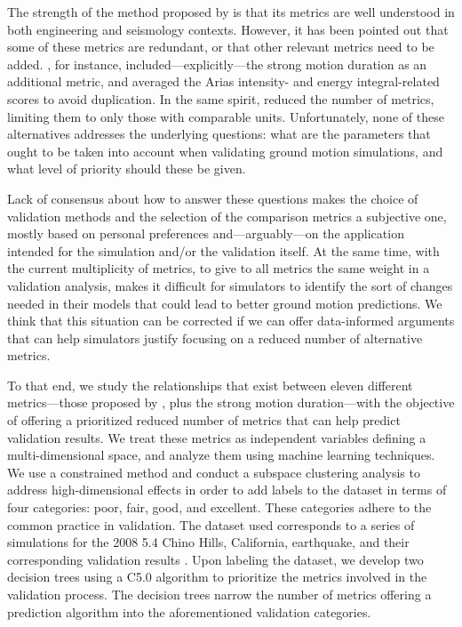 The strength of the method proposed by \citet{Anderson_2004_Proc} is that its metrics are well understood in both engineering and seismology contexts. However, it has been pointed out that some of these metrics are redundant, or that other relevant metrics need to be added. \citet{Taborda_2013_BSSA}, for instance, included---explicitly---the strong motion duration \citep{Trifunac_1975_BSSA} as an additional metric, and averaged the Arias intensity- and energy integral-related scores to avoid duplication. In the same spirit, \citet{Maufroy_2015_BSSA} reduced the number of metrics, limiting them to only those with comparable units. Unfortunately, none of these alternatives addresses the underlying questions: what are the parameters that ought to be taken into account when validating ground motion simulations, and what level of priority should these be given.

Lack of consensus about how to answer these questions makes the choice of validation methods and the selection of the comparison metrics a subjective one, mostly based on personal preferences and---arguably---on the application intended for the simulation and/or the validation itself. At the same time, with the current multiplicity of metrics, to give to all metrics the same weight in a validation analysis, makes it difficult for simulators to identify the sort of changes needed in their models that could lead to better ground motion predictions. We think that this situation can be corrected if we can offer data-informed arguments that can help simulators justify focusing on a reduced number of alternative metrics.

To that end, we study the relationships that exist between eleven different metrics---those proposed by \citet{Anderson_2004_Proc}, plus the strong motion duration---with the objective of offering a prioritized reduced number of metrics that can help predict validation results. We treat these metrics as independent variables defining a multi-dimensional space, and analyze them using machine learning techniques. We use a constrained \kmeans{} method \citep[e.g.,][]{Macqueen_1967_Proc, Wagstaff_2001_Proc} and conduct a subspace clustering analysis to address high-dimensional effects in order to add labels to the dataset in terms of four categories: poor, fair, good, and excellent. These categories adhere to the common practice in validation. The dataset used corresponds to a series of simulations for the 2008  5.4 Chino Hills, California, earthquake, and their corresponding validation results \citep{Taborda_2014_BSSA}. Upon labeling the dataset, we develop two decision trees using a C5.0 algorithm \citep[][]{Quinlan_1993_Book, Quinlan_1996_JAIR} to prioritize the metrics involved in the validation process. The decision trees narrow the number of metrics offering a prediction algorithm into the aforementioned validation categories.


